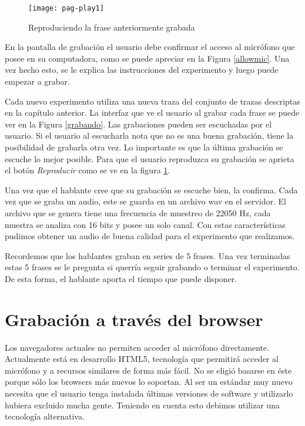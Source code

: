 \begin{figure}[h!]
    \centerline{\texttt{[image: pag-play1]} }
    \caption{Reproduciendo la frase anteriormente grabada}
    \label{reproduciendo}
\end{figure}

En la pantalla de grabación el usuario debe confirmar el acceso al micrófono que posee en su computadora, como se puede apreciar en la Figura \ref{allowmic}. Una vez hecho esto, se le explica las instrucciones del experimento y luego puede empezar a grabar. 

Cada nuevo experimento utiliza una nueva traza del conjunto de trazas descriptas en la capítulo anterior. La interfaz que ve el usuario al grabar cada frase se puede ver en la Figura \ref{grabando}. Las grabaciones pueden ser escuchadas por el usuario. Si el usuario al escucharla nota que no es una buena grabación, tiene la posibilidad de grabarla otra vez. Lo importante es que la última grabación se escuche lo mejor posible. Para que el usuario reproduzca su grabación se aprieta el botón \textit{Reproducir} como se ve en la figura \ref{reproduciendo}. 

Una vez que el hablante cree que su grabación se escuche bien, la confirma. Cada vez que se graba un audio, este se guarda en un archivo wav en el servidor. El archivo que se genera tiene una frecuencia de muestreo de 22050 Hz, cada muestra se analiza con 16 bits y posee un solo canal. Con estas características pudimos obtener un audio de buena calidad para el experimento que realizamos.

Recordemos que los hablantes graban en series de 5 frases. Una vez terminadas estas 5 frases se le pregunta si querría seguir grabando o terminar el experimento. De esta forma, el hablante aporta el tiempo que puede disponer.

\section{Grabación a través del browser}

Los navegadores actuales no permiten acceder al micrófono directamente. Actualmente está en desarrollo HTML5, tecnología que permitirá acceder al micrófono y a recursos similares de forma más fácil. No se eligió basarse en éste porque sólo los browsers más nuevos lo soportan. Al ser un estándar muy nuevo necesita que el usuario tenga instalada últimas versiones de software y utilizarlo hubiera excluido mucha gente. Teniendo en cuenta esto debimos utilizar una tecnología alternativa. 

